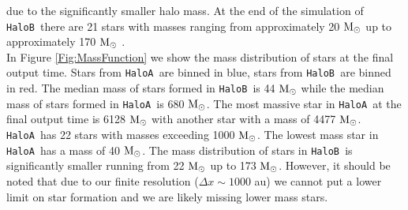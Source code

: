 \documentclass[graphics, twocolumn, usenatbib]{mn2e}
\newcommand{\msolar} {$\rm{M_{\odot}}~$}
\newcommand{\msolarc} {$\rm{M_{\odot}}$}
\newcommand{\ha} {\texttt{HaloA~}}
\newcommand{\hb} {\texttt{HaloB~}}
\begin{document}
due to the significantly smaller halo mass. At the end of the simulation of \hb there are 21 stars
with masses ranging from approximately 20 \msolar up to approximately 170 \msolar.\\
\indent In Figure \ref{Fig:MassFunction} we show the mass distribution of stars at the final
output time. Stars from \ha are binned in blue, stars from \hb are binned in red. The median mass
of stars formed in \hb is 44 \msolar while the median mass of stars formed in \ha is 680 \msolarc.
The most massive star in \ha at the final output time is 6128 \msolar with another star with a mass
of 4477 \msolarc. \ha has 22 stars with masses exceeding 1000 \msolarc. The lowest mass star in
\ha has a mass of 40 \msolarc. The mass distribution of stars in \hb is significantly smaller running
from 22 \msolar up to 173 \msolarc. However, it should be noted that due to our finite resolution
($\Delta x \sim 1000$ au) we cannot put a lower limit on star formation and we are likely missing lower mass stars. 
\end{document}
